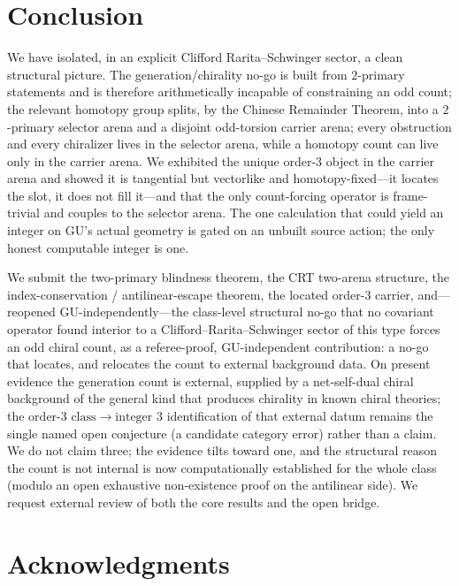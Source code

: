 \documentclass[11pt]{article}
\theoremstyle{definition}
\theoremstyle{remark}
\begin{document}
\section{Conclusion}\label{sec:conclusion}

We have isolated, in an explicit Clifford Rarita--Schwinger sector, a clean structural picture. The
generation/chirality no-go is built from $2$-primary statements and is therefore arithmetically incapable of
constraining an odd count; the relevant homotopy group splits, by the Chinese Remainder Theorem, into a
$2$-primary selector arena and a disjoint odd-torsion carrier arena; every obstruction and every chiralizer lives
in the selector arena, while a homotopy count can live only in the carrier arena. We exhibited the unique
order-$3$ object in the carrier arena and showed it is tangential but vectorlike and homotopy-fixed---it locates
the slot, it does not fill it---and that the only count-forcing operator is frame-trivial and couples to the
selector arena. The one calculation that could yield an integer on GU's actual geometry is gated on an unbuilt
source action; the only honest computable integer is one.

We submit the two-primary blindness theorem, the CRT two-arena structure, the index-conservation /
antilinear-escape theorem, the located order-$3$ carrier, and---reopened GU-independently---the class-level
structural no-go that no covariant operator found interior to a Clifford--Rarita--Schwinger sector of this type
forces an odd chiral count, as a referee-proof, GU-independent contribution: a no-go that locates, and relocates
the count to external background data. On present evidence the generation count is external, supplied by a
net-self-dual chiral background of the general kind that produces chirality in known chiral theories; the
$\text{order-}3\text{ class}\to\text{integer }3$ identification of that external datum remains the single named
open conjecture (a candidate category error) rather than a claim. We do not claim three; the evidence tilts
toward one, and the structural reason the count is not internal is now computationally established for the whole
class (modulo an open exhaustive non-existence proof on the antilinear side). We request external review of both
the core results and the open bridge.

\section*{Acknowledgments}
\end{document}
